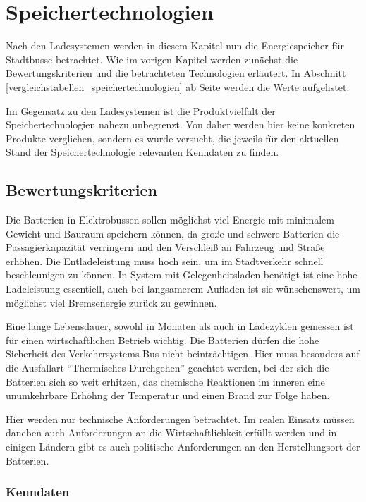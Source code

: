 \chapter{Speichertechnologien}

Nach den Ladesystemen werden in diesem Kapitel nun die Energiespeicher für Stadtbusse betrachtet. Wie im vorigen Kapitel werden zunächst die Bewertungskriterien und die betrachteten Technologien erläutert. In Abschnitt \ref{vergleichstabellen_speichertechnologien} ab Seite \pageref{vergleichstabellen_speichertechnologien} werden die Werte aufgelistet.

Im Gegensatz zu den Ladesystemen ist die Produktvielfalt der Speichertechnologien nahezu unbegrenzt. Von daher werden hier keine konkreten Produkte verglichen, sondern es wurde versucht, die jeweils für den aktuellen Stand der Speichertechnologie relevanten Kenndaten zu finden.

\section{Bewertungskriterien}
Die Batterien in Elektrobussen sollen möglichst viel Energie mit minimalem Gewicht und Bauraum speichern können, da große und schwere Batterien die Passagierkapazität verringern und den Verschleiß an Fahrzeug und Straße erhöhen. Die Entladeleistung muss hoch sein, um im Stadtverkehr schnell beschleunigen zu können. In System mit Gelegenheitsladen benötigt ist eine hohe Ladeleistung essentiell, auch bei langsamerem Aufladen ist sie wünschenswert, um möglichst viel Bremsenergie zurück zu gewinnen.

Eine lange Lebensdauer, sowohl in Monaten als auch in Ladezyklen gemessen ist für einen wirtschaftlichen Betrieb wichtig. Die Batterien dürfen die hohe Sicherheit des Verkehrrsystems Bus nicht beinträchtigen. Hier muss besonders auf die Ausfallart "`Thermisches Durchgehen"' geachtet werden, bei der sich die Batterien sich so weit erhitzen, das chemische Reaktionen im inneren eine unumkehrbare Erhöhng der Temperatur und einen Brand zur Folge haben.

Hier werden nur technische Anforderungen betrachtet. Im realen Einsatz müssen daneben auch Anforderungen an die Wirtschaftlichkeit erfüllt werden und in einigen Ländern gibt es auch politische Anforderungen an den Herstellungsort der Batterien.

\subsection{Kenndaten}

